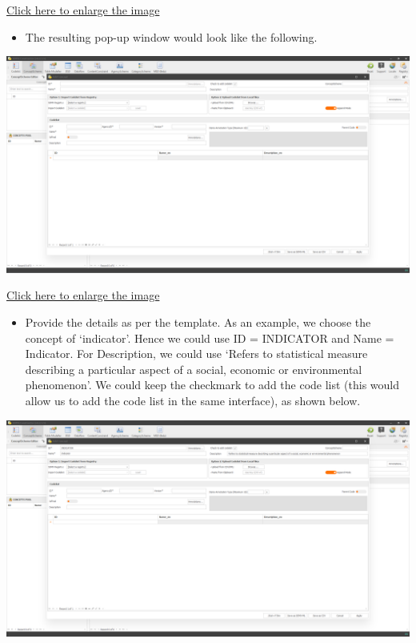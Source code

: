 \documentclass[
]{book}
\providecommand{\tightlist}{%
  \setlength{\itemsep}{0pt}\setlength{\parskip}{0pt}}
\begin{document}
\href{images/image239.png}{Click here to enlarge the image}

\begin{itemize}
\tightlist
\item
  The resulting pop-up window would look like the following.
\end{itemize}

\begin{center}\includegraphics[width=1\linewidth]{./images/image240} \end{center}

\href{images/image240.png}{Click here to enlarge the image}

\begin{itemize}
\tightlist
\item
  Provide the details as per the template. As an example, we choose the concept of `indicator'. Hence we could use ID = INDICATOR and Name = Indicator. For Description, we could use `Refers to statistical measure describing a particular aspect of a social, economic or environmental phenomenon'. We could keep the checkmark to add the code list (this would allow us to add the code list in the same interface), as shown below.
\end{itemize}

\begin{center}\includegraphics[width=1\linewidth]{./images/image241} \end{center}
\end{document}
